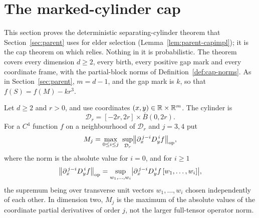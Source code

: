 \section{The marked-cylinder cap}\label{sec:cap}

This section proves the deterministic separating-cylinder theorem that Section~\ref{sec:parent} uses for elder selection (Lemma~\ref{lem:parent-capimpl}); it is the cap theorem on which \cite{parentP} relies. Nothing in it is probabilistic. The theorem covers every dimension $d\ge2$, every birth, every positive gap mark and every coordinate frame, with the partial-block norms of Definition~\ref{def:cap-norms}. As in Section~\ref{sec:parent}, $m=d-1$, and the gap mark is $k$, so that $f(S)=f(M)-kr^3$.

\begin{definition}\label{def:cap-norms}
Let $d\ge2$ and $r>0$, and use coordinates $(x,y)\in\mathbb R\times\mathbb R^m$. The cylinder is
\begin{equation}\label{eq:cap-D}
\mathcal D_r=[-2r,2r]\times\bar B(0,2r).
\end{equation}
For a $C^4$ function $f$ on a neighbourhood of $\mathcal D_r$ and $j=3,4$ put
\begin{equation}\label{eq:cap-Mj}
M_j=\max_{0\le i\le j}\ \sup_{\mathcal D_r}\bigl\|\partial_x^{\,j-i}D_y^{\,i}f\bigr\|_{\rm op},
\end{equation}
where the norm is the absolute value for $i=0$, and for $i\ge1$
\[
\bigl\|\partial_x^{\,j-i}D_y^{\,i}f\bigr\|_{\rm op}=\sup_{w_1,\dots,w_i}\bigl|\partial_x^{\,j-i}D_y^{\,i}f\,[w_1,\dots,w_i]\bigr|,
\]
the supremum being over transverse unit vectors $w_1,\dots,w_i$ chosen independently of each other. In dimension two, $M_j$ is the maximum of the absolute values of the coordinate partial derivatives of order $j$, not the larger full-tensor operator norm.
\end{definition}


